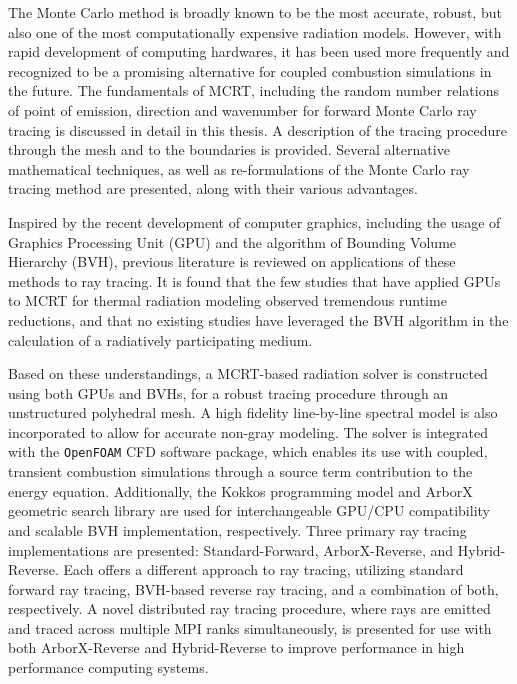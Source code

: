 The Monte Carlo method is broadly known to be the most accurate, robust, but also one of the most computationally expensive radiation models.
However, with rapid development of computing hardwares, it has been used more frequently and recognized to be a promising alternative for coupled combustion simulations in the future.
The fundamentals of MCRT, including the random number relations of point of emission, direction and wavenumber for forward Monte Carlo ray tracing is discussed in detail in this thesis.
A description of the tracing procedure through the mesh and to the boundaries is provided.
Several alternative mathematical techniques, as well as re-formulations of the Monte Carlo ray tracing method are presented, along with their various advantages. 

Inspired by the recent development of computer graphics, including the usage of Graphics Processing Unit (GPU) and the algorithm of Bounding Volume Hierarchy (BVH), 
previous literature is reviewed on applications of these methods to ray tracing. It is found that the few studies that have applied GPUs to MCRT for thermal radiation modeling observed tremendous runtime reductions, and that no existing studies have leveraged the BVH algorithm in the calculation of a radiatively participating medium.

Based on these understandings, 
a MCRT-based radiation solver is constructed using both GPUs and BVHs, for a robust tracing procedure through an unstructured polyhedral mesh. A high fidelity line-by-line spectral model is also incorporated to allow for accurate non-gray modeling.
The solver is integrated with the \verb|OpenFOAM| CFD software package, which enables its use with coupled, transient combustion simulations through a source term contribution to the energy equation. Additionally, the Kokkos programming model and ArborX geometric search library are used for interchangeable GPU/CPU compatibility and scalable BVH implementation, respectively. Three primary ray tracing implementations are presented: Standard-Forward, ArborX-Reverse, and Hybrid-Reverse. Each offers a different approach to ray tracing, utilizing standard forward ray tracing, BVH-based reverse ray tracing, and a combination of both, respectively. A novel distributed ray tracing procedure, where rays are emitted and traced across multiple MPI ranks simultaneously, is presented for use with both ArborX-Reverse and Hybrid-Reverse to improve performance in high performance computing systems.

